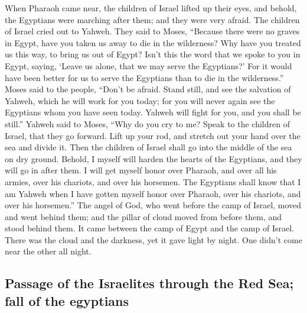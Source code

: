  When Pharaoh came near, the children of Israel lifted up
their eyes, and behold, the Egyptians were marching after them; and they
were very afraid. The children of Israel cried out to Yahweh.
 They said to Moses, ``Because there were no graves in
Egypt, have you taken us away to die in the wilderness? Why have you
treated us this way, to bring us out of Egypt?  Isn't
this the word that we spoke to you in Egypt, saying, `Leave us alone,
that we may serve the Egyptians?' For it would have been better for us
to serve the Egyptians than to die in the wilderness.'' 
Moses said to the people, ``Don't be afraid. Stand still, and see the
salvation of Yahweh, which he will work for you today; for you will
never again see the Egyptians whom you have seen today. 
Yahweh will fight for you, and you shall be still.'' 
Yahweh said to Moses, ``Why do you cry to me? Speak to the children of
Israel, that they go forward.  Lift up your rod, and
stretch out your hand over the sea and divide it. Then the children of
Israel shall go into the middle of the sea on dry ground.
 Behold, I myself will harden the hearts of the
Egyptians, and they will go in after them. I will get myself honor over
Pharaoh, and over all his armies, over his chariots, and over his
horsemen.  The Egyptians shall know that I am Yahweh when
I have gotten myself honor over Pharaoh, over his chariots, and over his
horsemen.''  The angel of God, who went before the camp
of Israel, moved and went behind them; and the pillar of cloud moved
from before them, and stood behind them.  It came between
the camp of Egypt and the camp of Israel. There was the cloud and the
darkness, yet it gave light by night. One didn't come near the other all
night.

\hypertarget{passage-of-the-israelites-through-the-red-sea-fall-of-the-egyptians}{%
\subsection{Passage of the Israelites through the Red Sea; fall of the
egyptians}\label{passage-of-the-israelites-through-the-red-sea-fall-of-the-egyptians}}

